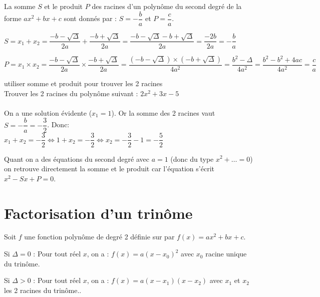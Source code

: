     \begin{bprop}
        La somme $S$ et le produit $P$ des racines d'un polynôme du second degré de la forme $ax^2+bx+c$ sont donnés par : $S=- \dfrac{b}{a}$  et $P= \dfrac{c}{a}$. 
    \end{bprop}
    
    \begin{bdemo}
        \begin{itemDem}
            \item $S=x_1+x_2=\dfrac{-b-\sqrt{\Delta}}{2a}+\dfrac{-b+\sqrt{\Delta}}{2a}=\dfrac{-b-\sqrt{\Delta}-b+\sqrt{\Delta}}{2a}=\dfrac{-2b}{2a}=- \dfrac{b}{a}$
            \item $P=x_1\times x_2=\dfrac{-b-\sqrt{\Delta}}{2a}\times \dfrac{-b+\sqrt{\Delta}}{2a}=\dfrac{(-b-\sqrt{\Delta})\times(-b+\sqrt{\Delta})}{4a^2}=\dfrac{b^2-\Delta}{4a^2}=\dfrac{b^2-b^2+4ac}{4a^2}=\dfrac{c}{a}$
        \end{itemDem}
    \end{bdemo}
    
    \begin{bmethodet}{utiliser somme et produit pour trouver les 2 racines}
        \\
        Trouver les 2 racines du polynôme suivant : $2x^2+3x-5$\\
        \\
        On a une solution évidente ($x_1=1$). Or la somme des 2 racines vaut $S=- \dfrac{b}{a}=-\dfrac{3}{2}$. Donc:\\
        $x_1+x_2=-\dfrac{3}{2} \iff 1+x_2=-\dfrac{3}{2} \iff x_2=-\dfrac{3}{2}-1=-\dfrac{5}{2}$
    \end{bmethodet}

	\begin{brmq}
		Quant on a des équations du second degré avec $a=1$ (donc du type $x^2+\ldots=0$) on retrouve directement la somme et le produit car l'équation s'écrit $x^2-Sx+P=0$.
	\end{brmq}
        
    
\section{Factorisation d'un trinôme}

    \begin{bprop}
        Soit $f$ une fonction polynôme de degré 2 définie sur \R  par $f(x)=ax^2+bx+c$.
        \begin{itemProp}
            \item Si $\Delta = 0$ : Pour tout réel $x$, on a : $f(x)=a(x-x_0 )^2$ avec $x_0$ racine unique du trinôme.
            \item Si $\Delta > 0$ : Pour tout réel $x$, on a : $f(x)=a(x-x_1 )(x-x_2 )$ avec $x_1$ et $x_2$ les 2 racines du trinôme..
        \end{itemProp}
    \end{bprop}
    
